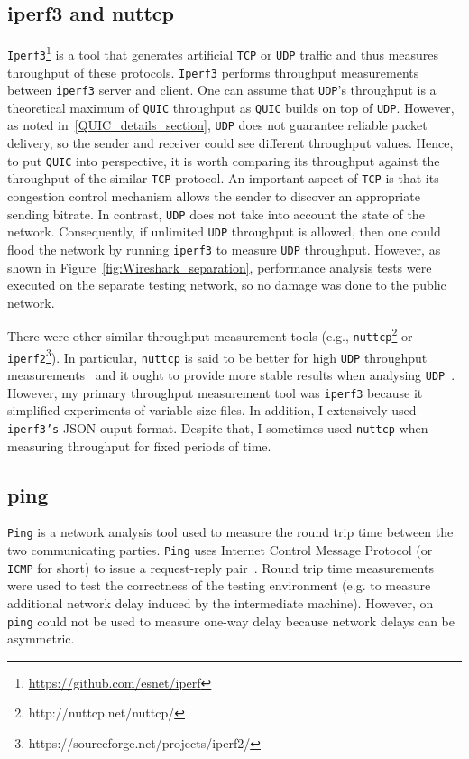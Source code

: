 \documentclass[12pt,a4paper,twoside,openright]{report}
\newcommand\note[2]{{\color{#1}\bf #2}}
\newcommand\simon[1]{\ifcomments{\note{cyan}{SM: #1}}\fi}
\begin{document}
\subsection{iperf3 and nuttcp}
\texttt{Iperf3}\footnote{\url{https://github.com/esnet/iperf}} is a tool that generates artificial \texttt{TCP} or \texttt{UDP} traffic and thus measures throughput of these protocols.
\texttt{Iperf3} performs throughput measurements between \texttt{iperf3} server and client.
One can assume that \texttt{UDP}'s throughput is a theoretical maximum of \texttt{QUIC} throughput as \texttt{QUIC} builds on top of \texttt{UDP}.
However, as noted in~\ref{QUIC_details_section}, \texttt{UDP} does not guarantee reliable packet delivery, so the sender and receiver could see different throughput values.
Hence, to put \texttt{QUIC} into perspective, it is worth comparing its throughput against the throughput of the similar \texttt{TCP} protocol.
An important aspect of \texttt{TCP} is that its congestion control mechanism allows the sender to discover an appropriate sending bitrate.
In contrast, \texttt{UDP} does not take into account the state of the network.
Consequently, if unlimited \texttt{UDP} throughput is allowed, then one could flood the network by running \texttt{iperf3} to measure \texttt{UDP} throughput.
However, as shown in Figure~\ref{fig:Wireshark_separation}, performance analysis tests were executed on the separate testing network, so no damage was done to the public network.

There were other similar throughput measurement tools (e.g., \texttt{nuttcp}\footnote{http://nuttcp.net/nuttcp/} or \texttt{iperf2}\footnote{https://sourceforge.net/projects/iperf2/}).
In particular, \texttt{nuttcp} is said to be better for high \texttt{UDP} throughput measurements~\cite{network-troubleshooting-tools_nuttcp} and it ought to provide more stable results when analysing \texttt{UDP}~\cite{Nuttcp_geant}.
However, my primary throughput measurement tool was \texttt{iperf3} because it simplified experiments of variable-size files.
In addition, I extensively used \texttt{iperf3's} JSON ouput format.
Despite that, I sometimes used \texttt{nuttcp} when measuring throughput for fixed periods of time. 



\subsection{ping}
\texttt{Ping} is a network analysis tool used to measure the round trip time between the two communicating parties.
\texttt{Ping} uses Internet Control Message Protocol (or \texttt{ICMP} for short) to issue a request-reply pair~\cite{internet-control-message-protocol-icmp}.
Round trip time measurements were used to test the correctness of the testing environment (e.g. to measure additional network delay induced by the intermediate machine).
However, on \texttt{ping} could not be used to measure one-way delay because network delays can be asymmetric.
\end{document}
